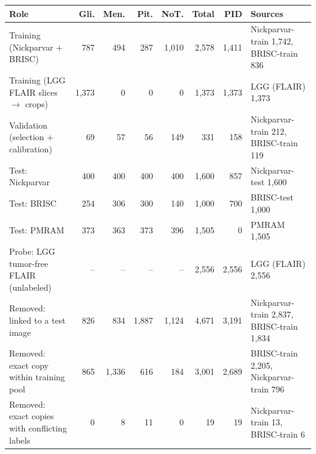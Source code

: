 \begin{tabular}{>{\raggedright\arraybackslash}p{3.0cm} r r r r r r >{\raggedright\arraybackslash}p{2.9cm}}
\toprule
\textbf{Role} & \textbf{Gli.} & \textbf{Men.} & \textbf{Pit.} & \textbf{NoT.} & \textbf{Total} & \textbf{PID} & \textbf{Sources} \\
\midrule
Training (Nickparvar + BRISC) & 787 & 494 & 287 & 1,010 & 2,578 & 1,411 & Nickparvar-train 1,742, BRISC-train 836 \\
Training (LGG FLAIR slices $\rightarrow$ crops) & 1,373 & 0 & 0 & 0 & 1,373 & 1,373 & LGG (FLAIR) 1,373 \\
Validation (selection + calibration) & 69 & 57 & 56 & 149 & 331 & 158 & Nickparvar-train 212, BRISC-train 119 \\
Test: Nickparvar & 400 & 400 & 400 & 400 & 1,600 & 857 & Nickparvar-test 1,600 \\
Test: BRISC & 254 & 306 & 300 & 140 & 1,000 & 700 & BRISC-test 1,000 \\
Test: PMRAM & 373 & 363 & 373 & 396 & 1,505 & 0 & PMRAM 1,505 \\
Probe: LGG tumor-free FLAIR (unlabeled) & -- & -- & -- & -- & 2,556 & 2,556 & LGG (FLAIR) 2,556 \\
Removed: linked to a test image & 826 & 834 & 1,887 & 1,124 & 4,671 & 3,191 & Nickparvar-train 2,837, BRISC-train 1,834 \\
Removed: exact copy within training pool & 865 & 1,336 & 616 & 184 & 3,001 & 2,689 & BRISC-train 2,205, Nickparvar-train 796 \\
Removed: exact copies with conflicting labels & 0 & 8 & 11 & 0 & 19 & 19 & Nickparvar-train 13, BRISC-train 6 \\
\bottomrule
\end{tabular}
